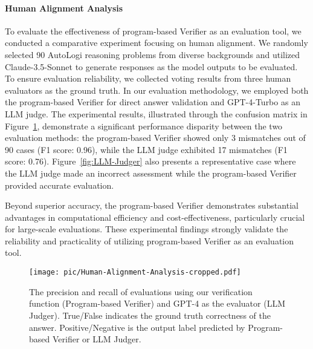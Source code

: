 \paragraph{Human Alignment Analysis}
\label{sec:human-alignment}
To evaluate the effectiveness of program-based Verifier as an evaluation tool, we conducted a comparative experiment focusing on human alignment. We randomly selected 90 AutoLogi reasoning problems from diverse backgrounds and utilized Claude-3.5-Sonnet to generate responses as the model outputs to be evaluated. To ensure evaluation reliability, we collected voting results from three human evaluators as the ground truth. In our evaluation methodology, we employed both the program-based Verifier for direct answer validation and GPT-4-Turbo as an LLM judge. 
The experimental results, illustrated through the confusion matrix in Figure~\ref{fig:CodeVsModel}, demonstrate a significant performance disparity between the two evaluation methods: the program-based Verifier showed only 3 mismatches out of 90 cases (F1 score: 0.96), while the LLM judge exhibited 17 mismatches (F1 score: 0.76). Figure~\ref{fig:LLM-Judger} also presents a representative case where the LLM judge made an incorrect assessment while the program-based Verifier provided accurate evaluation.

Beyond superior accuracy, the program-based Verifier demonstrates substantial advantages in computational efficiency and cost-effectiveness, particularly crucial for large-scale evaluations. These experimental findings strongly validate the reliability and practicality of utilizing program-based Verifier as an evaluation tool.

\begin{figure}[!t]
  \centering
  \texttt{[image: pic/Human-Alignment-Analysis-cropped.pdf]}
  \caption{The precision and recall of evaluations using our verification function (Program-based Verifier) and GPT-4 as the evaluator (LLM Judger). True/False indicates the ground truth correctness of the answer. Positive/Negative is the output label predicted by Program-based Verifier or LLM Judger.}
  \label{fig:CodeVsModel}
\end{figure}

